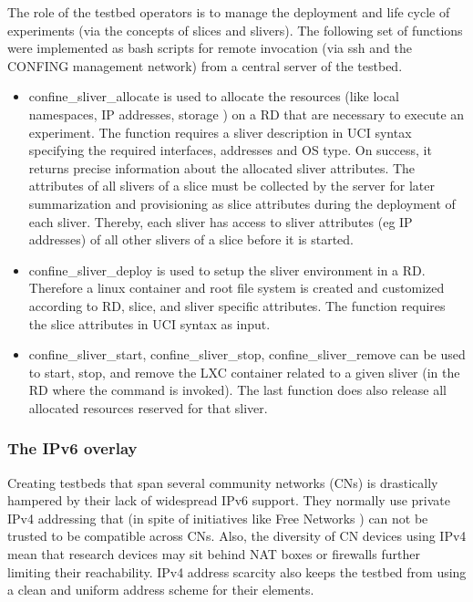 \documentclass[conference]{IEEEtran}
\begin{document}
The role of the testbed operators is to manage the deployment and life
cycle of experiments (via the concepts of slices and slivers). The
following set of functions were implemented as bash scripts for remote
invocation (via ssh and the CONFING management network) from a central
server of the testbed.
\begin{itemize}
\item confine\_sliver\_allocate is used to allocate the resources
  (like local namespaces, IP addresses, storage ) on a RD that are
  necessary to execute an experiment. The function requires a sliver
  description in UCI syntax specifying the required interfaces,
  addresses and OS type. On success, it returns precise information
  about the allocated sliver attributes. The attributes of all slivers
  of a slice must be collected by the server for later summarization
  and provisioning as slice attributes during the deployment of each
  sliver. Thereby, each sliver has access to sliver attributes (eg IP
  addresses) of all other slivers of a slice before it is started.
\item confine\_sliver\_deploy is used to setup the sliver environment
  in a RD. Therefore a linux container and root file system is created
  and customized according to RD, slice, and sliver specific
  attributes.  The function requires the slice attributes in UCI
  syntax as input.
\item confine\_sliver\_start, confine\_sliver\_stop,
  confine\_sliver\_remove can be used to start, stop, and remove the
  LXC container related to a given sliver (in the RD where the command
  is invoked). The last function does also release all allocated
  resources reserved for that sliver.

\end{itemize}





\subsubsection{The IPv6 overlay}

Creating testbeds that span several community networks (CNs) is drastically
hampered by their lack of widespread IPv6 support.  They normally use private
IPv4 addressing that (in spite of initiatives like Free Networks
\cite{free-networks}) can not be trusted to be compatible across CNs.  Also,
the diversity of CN devices using IPv4 mean that research devices may sit
behind NAT boxes or firewalls further limiting their reachability.  IPv4
address scarcity also keeps the testbed from using a clean and uniform
address scheme for their elements.
\end{document}
